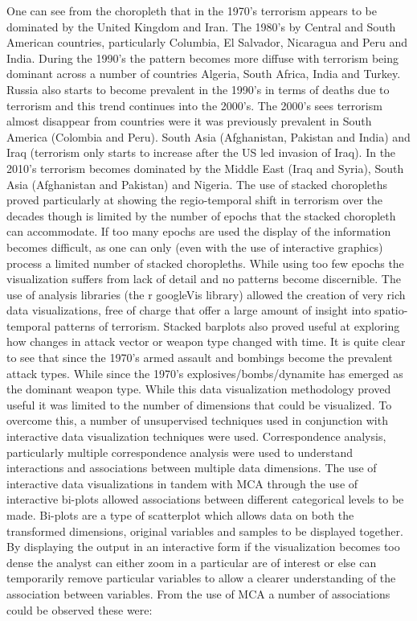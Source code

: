 One can see from the choropleth that in the 1970’s terrorism appears to be dominated by the United Kingdom and Iran. The 1980’s  by Central and South American countries, particularly Columbia, El Salvador, Nicaragua and Peru and India. During the 1990’s the pattern becomes more diffuse with terrorism being dominant across a number of countries Algeria, South Africa, India and Turkey. Russia also starts to become prevalent in the 1990’s in terms of deaths due to terrorism and this trend continues into the 2000’s. The 2000’s sees terrorism almost disappear from countries were it was previously prevalent in South America (Colombia and Peru). South Asia (Afghanistan, Pakistan and India) and Iraq (terrorism only starts to increase after the US led invasion of Iraq). In the 2010’s terrorism becomes dominated by the Middle East (Iraq and Syria), South Asia (Afghanistan and Pakistan) and Nigeria. The use of stacked choropleths proved particularly at showing the regio-temporal shift in terrorism over the decades though is limited by the number of epochs that the stacked choropleth can accommodate. If too many epochs are used the display of the information becomes difficult, as one can only (even with the use of interactive graphics) process a limited number of stacked choropleths. While using too few epochs the visualization suffers from lack of detail and no patterns become discernible. The use of analysis libraries (the r googleVis library) allowed the creation of very rich data visualizations, free of charge that offer a large amount of insight into spatio-temporal patterns of terrorism.
Stacked barplots also proved useful at exploring how changes in attack vector or weapon type changed with time. It is quite clear to see that since the 1970’s armed assault and bombings become the prevalent attack types. While since the 1970’s explosives/bombs/dynamite has emerged as the dominant weapon type.  While this data visualization methodology proved useful it was limited to the number of dimensions that could be visualized. To overcome this, a number of unsupervised techniques used in conjunction with interactive data visualization techniques were used. Correspondence analysis, particularly multiple correspondence analysis were used to understand interactions and associations between multiple data dimensions. The use of interactive data visualizations in tandem with MCA through the use of interactive bi-plots allowed associations between different categorical levels to be made. Bi-plots are a type of scatterplot which allows data on both the transformed dimensions,  original variables and samples to be displayed together. By displaying the output in an interactive form if the visualization becomes too dense the analyst can either zoom in a particular are of interest or else can temporarily remove particular variables to allow a clearer understanding of the association between variables. From the use of MCA a number of associations could be observed these were:

